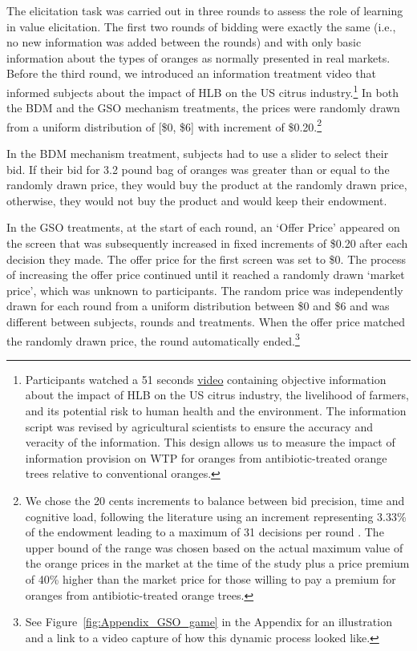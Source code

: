 \documentclass[12pt]{article}
\begin{document}
The elicitation task was carried out in three rounds to assess the role of learning \citep{corrigan2008testing, drichoutis2011role} in value elicitation. The first two rounds of bidding were exactly the same (i.e., no new information was added between the rounds) and with only basic information about the types of oranges as normally presented in real markets. Before the third round, we introduced an information treatment video that informed subjects about the impact of HLB on the US citrus industry.\footnote{Participants watched a 51 seconds \href{https://www.youtube.com/watch?v=_AqMBjB0ChM}{video} containing objective information about the impact of HLB on the US citrus industry, the livelihood of farmers, and its potential risk to human health and the environment. The information script was revised by agricultural scientists to ensure the accuracy and veracity of the information. This design allows us to measure the impact of information provision on WTP for oranges from antibiotic-treated orange trees relative to conventional oranges.} In both the BDM and the GSO mechanism treatments, the prices were randomly drawn from a uniform distribution of [\$0, \$6] with increment of \$0.20.\footnote{We chose the 20 cents increments to balance between bid precision, time and cognitive load, following the literature using an increment representing 3.33\% of the endowment leading to a maximum of 31 decisions per round \citep{li_obviously_2017, chakraborty_future_2025}. The upper bound of the range was chosen based on the actual maximum value of the orange prices in the market at the time of the study plus a price premium of 40\% higher than the market price for those willing to pay a premium for oranges from antibiotic-treated orange trees.}

In the BDM mechanism treatment, subjects had to use a slider to select their bid. If their bid for 3.2 pound bag of oranges was greater than or equal to the randomly drawn price, they would buy the product at the randomly drawn price, otherwise, they would not buy the product and would keep their endowment.

In the GSO treatments, at the start of each round, an `Offer Price' appeared on the screen that was subsequently increased in fixed increments of \$0.20 after each decision they made. The offer price for the first screen was set to \$0. The process of increasing the offer price continued until it reached a randomly drawn `market price', which was unknown to participants. The random price was independently drawn for each round from a uniform distribution between \$0 and \$6 and was different between subjects, rounds and treatments. When the offer price matched the randomly drawn price, the round automatically ended.\footnote{See Figure~\ref{fig:Appendix_GSO_game} in the Appendix for an illustration and a link to a video capture of how this dynamic process looked like.} 
\end{document}
